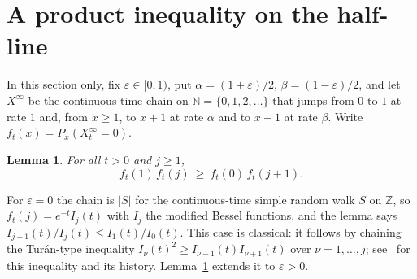 \documentclass[11pt]{amsart}
\newtheorem{lemma}[theorem]{Lemma}
\theoremstyle{remark}
\newcommand{\eps}{\varepsilon}
\newcommand{\Z}{\mathbb{Z}}
\newcommand{\N}{\mathbb{N}}
\begin{document}
\section{A product inequality on the half-line}\label{sec:halfline}

In this section only, fix $\eps\in[0,1)$, put $\alpha=(1+\eps)/2$, $\beta=(1-\eps)/2$, and let $X^\infty$ be the
continuous-time chain on $\N=\{0,1,2,\dots\}$ that jumps from $0$ to $1$ at rate $1$ and, from $x\ge1$, to $x+1$ at
rate $\alpha$ and to $x-1$ at rate $\beta$. Write $f_t(x)=P_x(X^\infty_t=0)$.

\begin{lemma}\label{lem:halfline}
For all $t>0$ and $j\ge1$,
\[
  f_t(1)\,f_t(j)\ \ge\ f_t(0)\,f_t(j+1).
\]
\end{lemma}

For $\eps=0$ the chain is $|S|$ for the continuous-time simple random walk $S$ on $\Z$, so $f_t(j)=e^{-t}I_j(t)$ with
$I_j$ the modified Bessel functions, and the lemma says $I_{j+1}(t)/I_j(t)\le I_1(t)/I_0(t)$. This case is classical: it follows by chaining the
Tur\'an-type inequality $I_\nu(t)^2\ge I_{\nu-1}(t)I_{\nu+1}(t)$ over $\nu=1,\dots,j$; see~\cite{BP} for this inequality
and its history. Lemma~\ref{lem:halfline} extends it to $\eps>0$.
\end{document}
